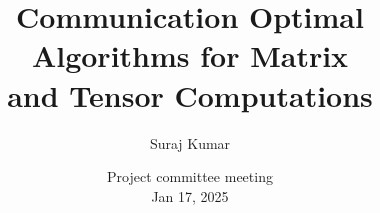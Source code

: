 \documentclass[aspectratio=169]{beamer}
\begin{document}

%
%


\title[Communication Optimal Algorithms]{Communication Optimal Algorithms for Matrix\\ and Tensor Computations} %

\author[Suraj {\sc Kumar}]{Suraj {\sc Kumar}} %
\date[Jan 17, 2025]{Project committee meeting\\Jan 17, 2025} %


\begin{frame}
	\titlepage %
\end{frame}
\end{document}
